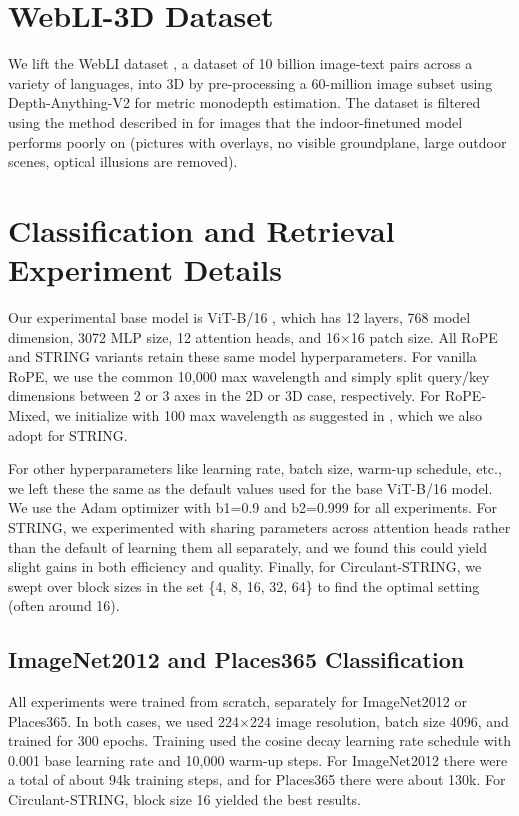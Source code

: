\section{WebLI-3D Dataset}  \label{app:webli}
We lift the WebLI dataset \citep{chen2023pali}, a dataset of 10 billion image-text pairs across a variety of languages, into 3D by pre-processing a 60-million image subset using Depth-Anything-V2 \citep{yang2024depthv2} for metric monodepth estimation.
The dataset is filtered using the method described in \citep{chen2024spatialvlm} for images that the indoor-finetuned model performs poorly on (pictures with overlays, no visible groundplane, large outdoor scenes, optical illusions are removed).

\section{Classification and Retrieval Experiment Details}
\label{app:classif_and_retrieval}

Our experimental base model is ViT-B/16 \citep{dosovitskiy2020vit}, which has 12 layers, 768 model dimension, 3072 MLP size, 12 attention heads, and 16$\times$16 patch size.  All RoPE and STRING variants retain these same model hyperparameters.  For vanilla RoPE, we use the common 10,000 max wavelength and simply split query/key dimensions between 2 or 3 axes in the 2D or 3D case, respectively.  For RoPE-Mixed, we initialize with 100 max wavelength as suggested in \citet{heo2025rotary}, which we also adopt for STRING.

For other hyperparameters like learning rate, batch size, warm-up schedule, etc., we left these the same as the default values used for the base ViT-B/16 model.  We use the Adam optimizer with b1=0.9 and b2=0.999 for all experiments.  For STRING, we experimented with sharing parameters across attention heads rather than the default of learning them all separately, and we found this could yield slight gains in both efficiency and quality.  Finally, for Circulant-STRING, we swept over block sizes in the set \{4, 8, 16, 32, 64\} to find the optimal setting (often around 16).

\subsection{ImageNet2012 and Places365 Classification}
\label{app:classification}

All experiments were trained from scratch, separately for ImageNet2012 or Places365.  In both cases, we used 224$\times$224 image resolution, batch size 4096, and trained for 300 epochs.  Training used the cosine decay learning rate schedule with 0.001 base learning rate and 10,000 warm-up steps.  For ImageNet2012 there were a total of about 94k training steps, and for Places365 there were about 130k.  For Circulant-STRING, block size 16 yielded the best results.

